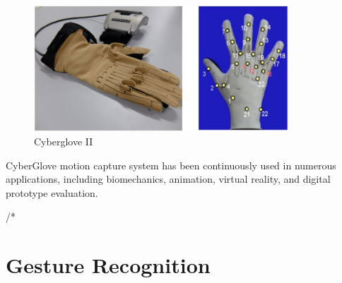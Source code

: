 \begin{figure}[h]
	\centering
		\includegraphics[width=0.85\textwidth]{images/cyberglove.png}
		\caption{Cyberglove II}
		\label{fig:glove}
\end{figure}

 CyberGlove motion capture system has been continuously used in numerous applications, including biomechanics, animation, virtual reality, and digital prototype evaluation.














\iffalse
/*\section{Gesture Recognition}

